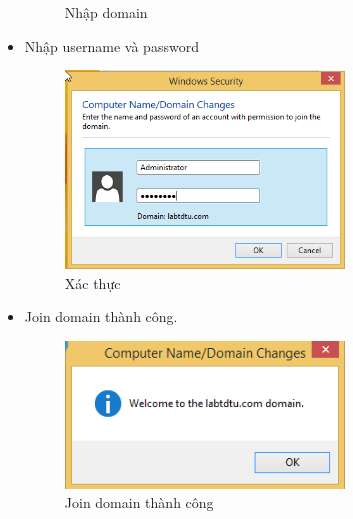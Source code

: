 \documentclass[13pt]{report}
\begin{document}
\begin{itemize}
\begin{figure}[htp]
			\caption{Nhập domain}
		\end{figure}
		\newpage\item Nhập username và password
		\begin{figure}[htp]
			\centering
			\includegraphics[width=0.7\textwidth]{image/Gui/FIT-PC/4.png}
			\caption{Xác thực}
		\end{figure}
		\item Join domain thành công.
		\begin{figure}[htp]
			\centering
			\includegraphics[width=0.7\textwidth]{image/Gui/FIT-PC/5.png}
			\caption{Join domain thành công}
		\end{figure}
	\end{itemize}
	\newpage
\end{document}
